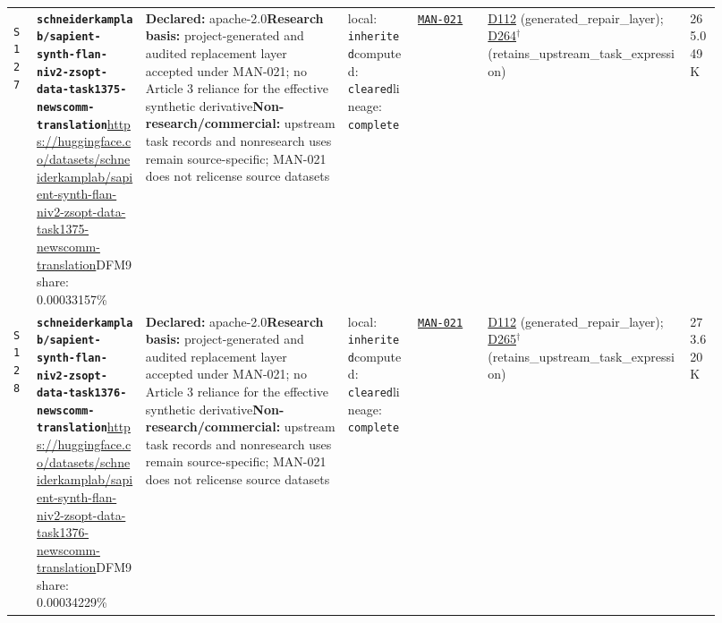 \documentclass[9pt,a4paper]{article}
\newcommand{\srcid}[1]{\hypertarget{src:#1}{\texttt{#1}}}
\begin{document}
\begin{landscape}
\begin{longtable}{@{}L{0.03\linewidth}L{0.14\linewidth}L{0.26\linewidth}L{0.09\linewidth}L{0.09\linewidth}L{0.265\linewidth}L{0.045\linewidth}@{}}
\srcid{S127} & \textbf{\nolinkurl{schneiderkamplab/sapient-synth-flan-niv2-zsopt-data-task1375-newscomm-translation}}\newline \url{https://huggingface.co/datasets/schneiderkamplab/sapient-synth-flan-niv2-zsopt-data-task1375-newscomm-translation}\newline DFM9 share: 0.00033157\% & \textbf{Declared:} apache-2.0\newline \textbf{Research basis:} project-generated and audited replacement layer accepted under MAN-021; no Article 3 reliance for the effective synthetic derivative\newline \textbf{Non-research/commercial:} upstream task records and nonresearch uses remain source-specific; MAN-021 does not relicense source datasets & local: \texttt{inherited}\newline computed: \texttt{cleared}\newline lineage: \texttt{complete} & \hyperlink{manual:MAN-021}{\texttt{MAN-021}} & \hyperlink{dep:D112}{D112} (generated\_repair\_layer); \hyperlink{dep:D264}{D264}$^{\dagger}$ (retains\_upstream\_task\_expression) & 265.049K \\
\srcid{S128} & \textbf{\nolinkurl{schneiderkamplab/sapient-synth-flan-niv2-zsopt-data-task1376-newscomm-translation}}\newline \url{https://huggingface.co/datasets/schneiderkamplab/sapient-synth-flan-niv2-zsopt-data-task1376-newscomm-translation}\newline DFM9 share: 0.00034229\% & \textbf{Declared:} apache-2.0\newline \textbf{Research basis:} project-generated and audited replacement layer accepted under MAN-021; no Article 3 reliance for the effective synthetic derivative\newline \textbf{Non-research/commercial:} upstream task records and nonresearch uses remain source-specific; MAN-021 does not relicense source datasets & local: \texttt{inherited}\newline computed: \texttt{cleared}\newline lineage: \texttt{complete} & \hyperlink{manual:MAN-021}{\texttt{MAN-021}} & \hyperlink{dep:D112}{D112} (generated\_repair\_layer); \hyperlink{dep:D265}{D265}$^{\dagger}$ (retains\_upstream\_task\_expression) & 273.620K \\

\end{longtable}
\end{landscape}
\end{document}
